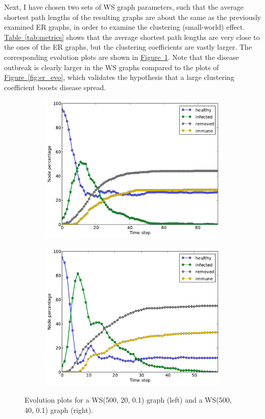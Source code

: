 \documentclass[11pt]{article} %
\newcommand{\figref}[1]{\mbox{Figure~\ref{#1}}}
\newcommand{\tabref}[1]{\mbox{Table~\ref{#1}}}
\renewcommand{\figref}[1]{\hyperref[#1]{\mbox{Figure~\ref*{#1}}}}
\renewcommand{\tabref}[1]{\hyperref[#1]{\mbox{Table~\ref*{#1}}}}
\begin{document}
Next, I have chosen two sets of WS graph parameters, such that the average
shortest path lengths of the resulting graphs
are about the same as the previously examined ER graphs, in order to
examine the clustering (small-world) effect. \tabref{tab:metrics} shows that
the average shortest path lengths are very close to the ones of the ER graphs,
but the clustering coefficients are vastly larger. The corresponding
evolution plots are shown in \figref{fig:ws_evo}. Note that the disease
outbreak is clearly larger in the WS graphs compared to the plots of
\figref{fig:er_evo}, which validates the hypothesis that a large clustering
coefficient boosts disease spread.

\begin{figure}[b]
  \begin{subfigure}[b]{0.5\textwidth}
    \centering
    \includegraphics[width=\textwidth]{figures/evo_WS_500_15_01}
  \end{subfigure}
  \begin{subfigure}[b]{0.5\textwidth}
    \centering
    \includegraphics[width=\textwidth]{figures/evo_WS_500_30_01}
  \end{subfigure}
  \caption{Evolution plots for a WS(500, 20, 0.1) graph (left) and a
    WS(500, 40, 0.1) graph (right).}
  \label{fig:ws_evo}
\end{figure}
\end{document}
